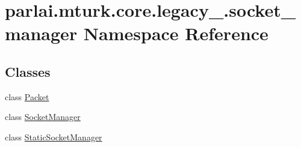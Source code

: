 \hypertarget{namespaceparlai_1_1mturk_1_1core_1_1legacy__2018_1_1socket__manager}{}\section{parlai.\+mturk.\+core.\+legacy\+\_.\+socket\+\_\+manager Namespace Reference}
\label{namespaceparlai_1_1mturk_1_1core_1_1legacy__2018_1_1socket__manager}
\subsection*{Classes}
\begin{DoxyCompactItemize}
\item 
class \hyperlink{classparlai_1_1mturk_1_1core_1_1legacy__2018_1_1socket__manager_1_1Packet}{Packet}
\item 
class \hyperlink{classparlai_1_1mturk_1_1core_1_1legacy__2018_1_1socket__manager_1_1SocketManager}{Socket\+Manager}
\item 
class \hyperlink{classparlai_1_1mturk_1_1core_1_1legacy__2018_1_1socket__manager_1_1StaticSocketManager}{Static\+Socket\+Manager}
\end{DoxyCompactItemize}

